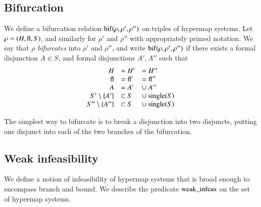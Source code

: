 \subsection{Bifurcation}



\begin{definition}
We define a bifurcation relation ${\operatorname{bif}}(\rho,\rho',\rho'')$ on
triples of  hypermap systems.  Let $\rho=(H,{\operatorname{fl}},S)$, and
similarly for $\rho'$ and $\rho''$ with appropriately primed
notation.  We say that $\rho$ {\it bifurcates} into $\rho'$ and
$\rho''$, and write ${\operatorname{bif}}(\rho,\rho',\rho'')$ if there exists
a formal disjunction $A\in S$, and formal disjunctions $A',A''$
such that
    $$
    \begin{array}{rlll}
    H &= H' &= H''\\
    {\operatorname{fl}} &= {\operatorname{fl}}' &= {\operatorname{fl}}''\\
        A &= A'&\cup\ A''\\
    S'\setminus  \{A'\} &\subset S &\cup\ {\operatorname{single}}(S)\\
    S''\setminus  \{A''\} &\subset S&\cup\ {\operatorname{single}}(S)\\
    \end{array}
    $$
\end{definition}
The simplest way to bifurcate is to break a disjunction into two
disjuncts, putting one disjunct into each of the two branches of
the bifurcation.



\subsection{Weak infeasibility}
\label{sec:weak}

We define a notion of infeasibility of  hypermap systems that is
broad enough to encompass branch and bound.  We describe the
predicate ${\operatorname{weak\_infeas}}$ on the set of hypermap systems.

